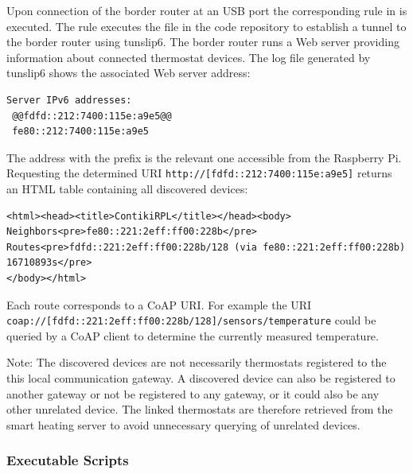 Upon connection of the border router at an USB port the corresponding rule in  is executed.
The rule executes the file  in the code repository to establish a tunnel to the border router using tunslip6.
The border router runs a Web server providing information about connected thermostat devices.
The log file  generated by tunslip6 shows the associated Web server address:

\begin{lstlisting}[numbers=none, moredelim={[is][keywordstyle]{@@}{@@}}]
Server IPv6 addresses:
 @@fdfd::212:7400:115e:a9e5@@
 fe80::212:7400:115e:a9e5
\end{lstlisting}

The address with the prefix  is the relevant one accessible from the Raspberry Pi.
Requesting the determined URI \nolinkurl{http://[fdfd::212:7400:115e:a9e5]} returns an HTML table containing all discovered devices:

\noindent
\begin{minipage}{\linewidth}
\begin{lstlisting}[numbers=none]
<html><head><title>ContikiRPL</title></head><body>
Neighbors<pre>fe80::221:2eff:ff00:228b</pre>
Routes<pre>fdfd::221:2eff:ff00:228b/128 (via fe80::221:2eff:ff00:228b) 16710893s</pre>
</body></html>
\end{lstlisting}
\end{minipage}

Each route corresponds to a CoAP URI. For example the URI \nolinkurl{coap://[fdfd::221:2eff:ff00:228b/128]/sensors/temperature} could be queried by a CoAP client to determine the currently measured temperature.

Note: The discovered devices are not necessarily thermostats registered to the this local communication gateway.
A discovered device can also be registered to another gateway or not be registered to any gateway, or it could also be any other unrelated device.
The linked thermostats are therefore retrieved from the smart heating server to avoid unnecessary querying of unrelated devices.


\subsubsection{Executable Scripts}
\label{sec:local_infrastructure_implementation_scripts}


